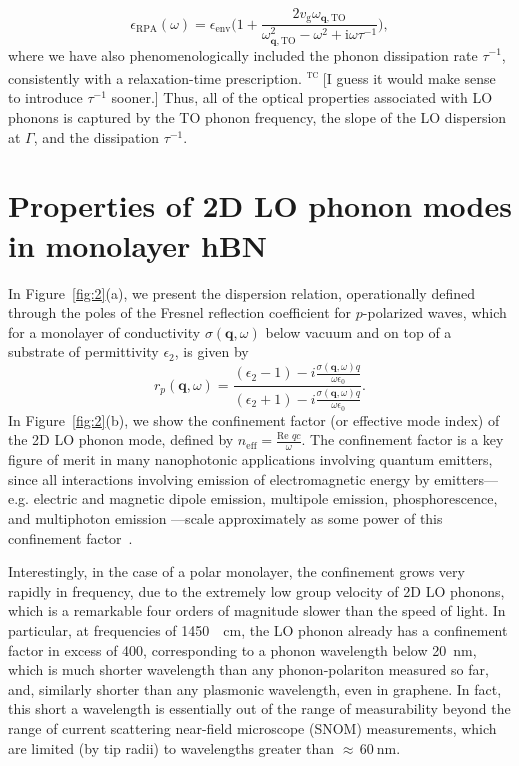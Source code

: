 \documentclass[aps,prb,twocolumn,
	           groupedaddress,superscriptaddress,
               amsfonts,amssymb,amsmath,floatfix,
	           citeautoscript]{revtex4-1}
\makeatletter
\newcommand{\iu}{\mathrm{i}}
\newcommand{\eg}{e.g.\@\xspace}
\newcommand{\comment}[2]{%
    \ifbool{togglecomments}%
    {\textcolor{blue!70!black}{\small\textsf{%
    \textsuperscript{\textsc{\textsf{\MakeLowercase{#1}}}}%
    [#2]}}} %
    {}}     %
\makeatother
\begin{document}
\begin{equation}
    \epsilon_{\mathrm{RPA}}(\omega) = \epsilon_{\mathrm{env}}\Bigg( 1 + \frac{2v_{\mathrm{g}}\omega_{\mathbf{q},\mathrm{TO}}}{\omega^2_{\mathbf{q},\mathrm{TO}}-\omega^2+\iu \omega \tau^{-1}}\Bigg),
\end{equation}
where we have also phenomenologically included the phonon dissipation rate $\tau^{-1}$, consistently with  a relaxation-time prescription. 
\comment{tc}{I guess it would make sense to introduce $\tau^{-1}$ sooner.}
Thus, all of the optical properties associated with LO phonons is captured by the TO phonon frequency, the slope of the LO dispersion at $\Gamma$, and the dissipation $\tau^{-1}$. %




\section{Properties of 2D LO phonon modes in monolayer hBN}

In Figure~\ref{fig:2}(a), we present the dispersion relation, operationally defined through the poles of the Fresnel reflection coefficient for $p$-polarized waves, which for a monolayer of conductivity $\sigma(\mathbf{q},\omega)$
below vacuum and on top of a substrate of permittivity $\epsilon_{2}$, is given by
\begin{equation}
    r_p(\mathbf{q},\omega) = \frac{(\epsilon_{2}-1)-i\frac{\sigma(\mathbf{q},\omega) q}{\omega\epsilon_0}}{(\epsilon_{2}+1)-i\frac{\sigma(\mathbf{q},\omega) q}{\omega \epsilon_0}}.
\end{equation}
In Figure~\ref{fig:2}(b), we show the confinement factor (or effective mode index) of the 2D LO phonon mode, defined by $n_{\mathrm{eff}} = \frac{\text{Re } qc}{\omega}$. 
The confinement factor is a key figure of merit in many nanophotonic applications involving quantum emitters, since all interactions involving emission of electromagnetic energy by emitters---\eg electric and magnetic dipole emission, multipole emission, phosphorescence, and multiphoton emission ---scale approximately as some power of this confinement factor~\cite{archambault2010quantum,koppens2011graphene,rivera2016shrinking,rivera2017making,sloan2018extreme}.

Interestingly, in the case of a polar monolayer, the confinement grows very rapidly in frequency, due to the extremely low group velocity of 2D LO phonons, which is a remarkable four orders of magnitude slower than the speed of light.  In particular, at frequencies of \SI{1450}{\per\cm}, the LO phonon already has a confinement factor in excess of \num{400}, corresponding to a phonon wavelength below \SI{20}{\nm}, which is much shorter wavelength than any phonon-polariton measured so far, and, similarly shorter than any plasmonic wavelength, even in graphene. In fact, this short a wavelength is essentially out of the range of measurability beyond the range of current scattering near-field microscope (SNOM) measurements, which are limited (by tip radii) to wavelengths greater than $\approx\,\SI{60}{\nm}$.
\end{document}
